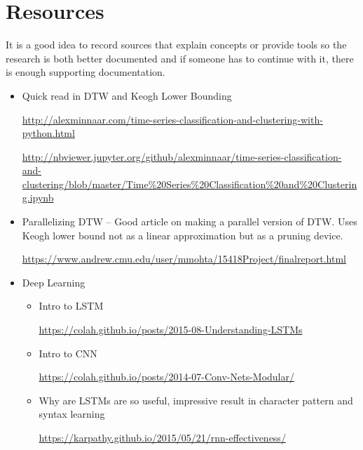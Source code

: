 \documentclass[11pt,letterpaper]{article}
\begin{document}





\clearpage
\appendix
\section{Resources}
\begin{tip}
It is a good idea to record sources that explain concepts or provide tools so the research is both better documented and if someone has to continue with it, there is enough supporting documentation.
\end{tip}
\begin{itemize}
    \item Quick read in DTW and Keogh Lower Bounding

\url{http://alexminnaar.com/time-series-classification-and-clustering-with-python.html}

\url{http://nbviewer.jupyter.org/github/alexminnaar/time-series-classification-and-clustering/blob/master/Time%20Series%20Classification%20and%20Clustering.ipynb}
    \item Parallelizing DTW -- Good article on making a parallel version of DTW. Uses Keogh lower bound not as a linear approximation but as a pruning device.

    \url{https://www.andrew.cmu.edu/user/mmohta/15418Project/finalreport.html}

    \item Deep Learning
    \begin{itemize}
        \item Intro to LSTM

        \url{https://colah.github.io/posts/2015-08-Understanding-LSTMs}
        
        \item Intro to CNN

        \url{https://colah.github.io/posts/2014-07-Conv-Nets-Modular/}

        \item Why are LSTMs are so useful, impressive result in character pattern and syntax learning

        \url{https://karpathy.github.io/2015/05/21/rnn-effectiveness/}
    \end{itemize}
\end{itemize}
\end{document}
